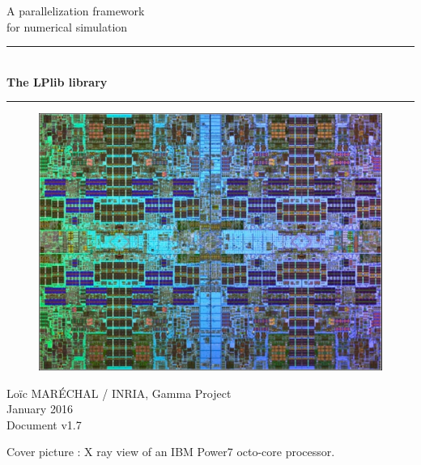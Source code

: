 \documentclass[a4paper,12pt]{article}
\newcommand{\HRule}{\rule{\linewidth}{1mm}}
\begin{document}
%
%

\begin{titlepage}

\begin{center}
\huge A parallelization framework\\ for numerical simulation
\HRule \\
\medskip
{\Huge \bfseries The LPlib library} \\
\HRule
\end{center}


\begin{figure}[htbp]
\begin{center}
\includegraphics[width=12cm]{power7.pdf}
\end{center}
\end{figure}


\begin{flushright}
\Large Lo\"ic MAR\'ECHAL / INRIA, Gamma Project\\
\Large January 2016 \\
\normalsize Document v1.7
\end{flushright}

\end{titlepage}

\clearpage

\setcounter{tocdepth}{2}
\tableofcontents
\vfill

\footnotesize{Cover picture : X ray view of an IBM Power7 octo-core processor.}
\normalsize
\end{document}

